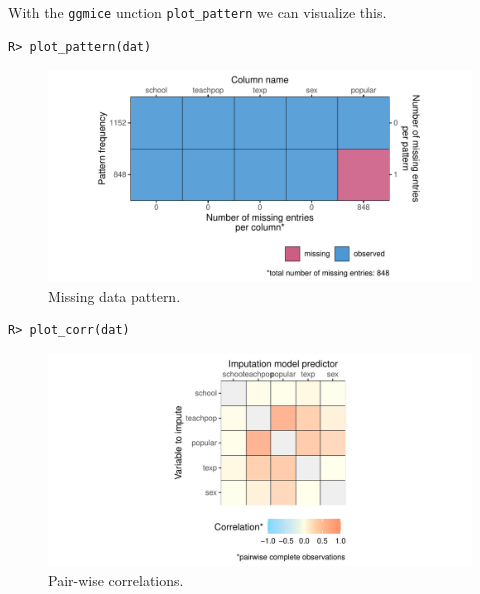 \documentclass[
  article]{jss}
\begin{document}
With the \texttt{ggmice} unction \texttt{plot\_pattern} we can visualize
this.

\begin{verbatim}
R> plot_pattern(dat)
\end{verbatim}

\begin{figure}[t]

{\centering \includegraphics{manuscript_files/figure-pdf/fig-pattern-1.pdf}

}

\caption{\label{fig-pattern}Missing data pattern.}

\end{figure}

\begin{figure}

\end{figure}

\begin{verbatim}
R> plot_corr(dat)
\end{verbatim}

\begin{figure}[t]

{\centering \includegraphics{manuscript_files/figure-pdf/unnamed-chunk-7-1.pdf}

}

\caption{Pair-wise correlations.}

\end{figure}
\end{document}
